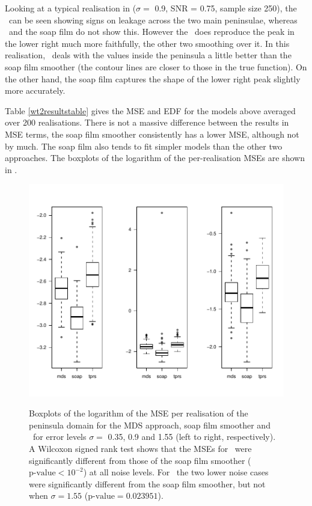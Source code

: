 {Looking at a typical realisation in  ($\sigma=$ 0.9, SNR = 0.75, sample size 250), the \tprs\ can be seen showing signs on leakage across the two main peninsulae, whereas \mdsap\ and the soap film do not show this. However the \tprs\ does reproduce the peak in the lower right much more faithfully, the other two smoothing over it. In this realisation, \mdsap\ deals with the values inside the peninsula a little better than the soap film smoother (the contour lines are closer to those in the true function). On the other hand, the soap film captures the shape of the lower right peak slightly more accurately.

Table \ref{wt2resultstable} gives the MSE and EDF for the models above averaged over 200 realisations. There is not a massive difference between the results in MSE terms, the soap film smoother consistently has a lower MSE, although not by much. The soap film also tends to fit simpler models than the other two approaches. The boxplots of the logarithm of the per-realisation MSEs are shown in .

\begin{figure}
\centering
\includegraphics[width=6in, trim=0in 0.5in 0in 0in]{mds/figs/mds-wt2-boxplot.pdf} \\
\caption{Boxplots of the logarithm of the MSE per realisation of the peninsula domain for the MDS approach, soap film smoother and \tprs\ for error levels $\sigma=$ 0.35, 0.9 and 1.55 (left to right, respectively). A Wilcoxon signed rank test shows that the MSEs for \tprs\ were significantly different from those of the soap film smoother ($\text{p-value} < 10^{-2}$) at all noise levels. For \mdsap\ the two lower noise cases were significantly different from the soap film smoother, but not when $\sigma=1.55$ ($\text{p-value} = 0.023951$).}
\label{mds-wt2-boxplot}
\end{figure}

}
